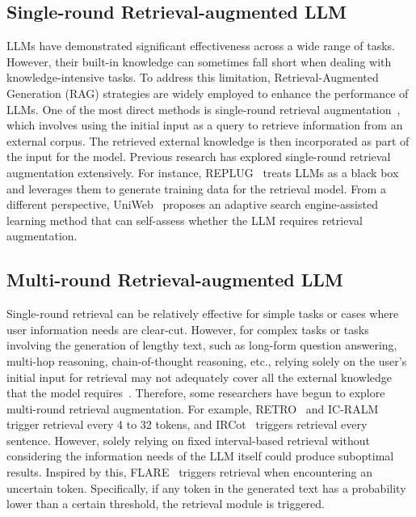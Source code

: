 \subsection{Single-round Retrieval-augmented LLM}

LLMs have demonstrated significant effectiveness across a wide range of tasks. 
However, their built-in knowledge can sometimes fall short when dealing with knowledge-intensive tasks. 
To address this limitation, Retrieval-Augmented Generation (RAG) strategies are widely employed to enhance the performance of LLMs.
One of the most direct methods is single-round retrieval augmentation~\cite{khandelwal2019generalization,borgeaud2022improving,lewis2020retrieval,guu2020retrieval,izacard2020leveraging,jiang2022retrieval,shi2023replug}, which involves using the initial input as a query to retrieve information from an external corpus. 
The retrieved external knowledge is then incorporated as part of the input for the model. 
Previous research has explored single-round retrieval augmentation extensively. 
For instance, REPLUG~\cite{shi2023replug} treats LLMs as a black box and leverages them to generate training data for the retrieval model. 
From a different perspective, UniWeb~\cite{li2023web} proposes an adaptive search engine-assisted learning method that can self-assess whether the LLM requires retrieval augmentation. 

\subsection{Multi-round Retrieval-augmented LLM}

Single-round retrieval can be relatively effective for simple tasks or cases where user information needs are clear-cut. 
However, for complex tasks or tasks involving the generation of lengthy text, such as long-form question answering, multi-hop reasoning, chain-of-thought reasoning, etc., relying solely on the user's initial input for retrieval may not adequately cover all the external knowledge that the model requires~\cite{jiang2023active}. 
Therefore, some researchers have begun to explore multi-round retrieval augmentation. For example, RETRO~\cite{borgeaud2022improving} and IC-RALM~\cite{ram2023context} trigger retrieval every 4 to 32 tokens, and IRCot~\cite{trivedi2022interleaving} triggers retrieval every sentence. 
However, solely relying on fixed interval-based retrieval without considering the information needs of the LLM itself could produce suboptimal results. 
Inspired by this, FLARE~\cite{jiang2023active} triggers retrieval when encountering an uncertain token.
Specifically, if any token in the generated text has a probability lower than a certain threshold, the retrieval module is triggered. 

